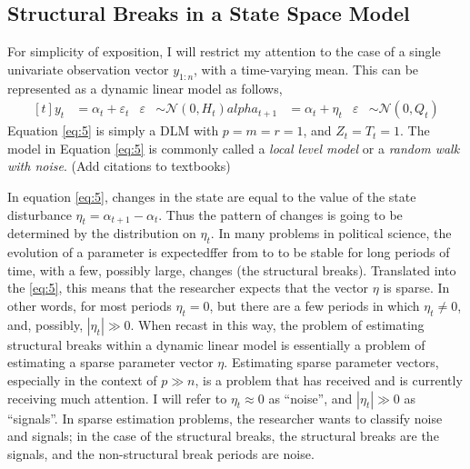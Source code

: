 \documentclass{article}
\newcommand{\paren}[1]{\ensuremath{\left(#1\right)}}
\newcommand{\dnorm}[1]{\ensuremath{\mathcal{N}\paren{#1}}}
\begin{document}
\subsection{Structural Breaks in a State Space Model}
\label{sec:struct-breaks-state}

For simplicity of exposition, I will restrict my attention to the case of a single univariate observation vector $y_{1:n}$, with a time-varying mean.
This can be represented as a dynamic linear model as follows,
\begin{equation}
  \label{eq:5}
  \begin{aligned}[t]
    y_{t} &= \alpha_{t} + \varepsilon_{t} & \varepsilon & \sim \dnorm{0, H_{t}}
    alpha_{t + 1} &= \alpha_{t} + \eta_{t} & \varepsilon & \sim \dnorm{0, Q_{t}}
  \end{aligned}
\end{equation}
Equation \eqref{eq:5} is simply a DLM with $p = m = r = 1$, and $Z_{t} = T_{t} = 1$.
The model in Equation \eqref{eq:5} is commonly called a \textit{local level model} or a \textit{random walk with noise}. (Add citations to textbooks)

In equation \eqref{eq:5}, changes in the state are equal to the value of the state disturbance $\eta_{t} = \alpha_{t+1} - \alpha_{t}$. 
Thus the pattern of changes is going to be determined by the distribution on $\eta_{t}$.
In many problems in political science, the evolution of a parameter is expectedffer from to to be stable for long periods of time, with a few, possibly large, changes (the structural breaks).
Translated into the \eqref{eq:5}, this means that the researcher expects that the vector $\eta$ is sparse. 
In other words, for most periods $\eta_{t} = 0$, but there are a few periods in which $\eta_{t} \neq 0$, and, possibly,  $|\eta_{t}| \gg 0$.
When recast in this way, the problem of estimating structural breaks within a dynamic linear model is essentially a problem of estimating a sparse parameter vector $\eta$.
Estimating sparse parameter vectors, especially in the context of $p \gg n$, is a problem that has received and is currently receiving much attention.
I will refer to $\eta_{t} \approx 0$ as ``noise'', and $|\eta_{t}| \gg 0$ as ``signals''. 
In sparse estimation problems, the researcher wants to classify noise and signals; in the case of the structural breaks, the structural breaks are the signals, and the non-structural break periods are noise.
\end{document}
